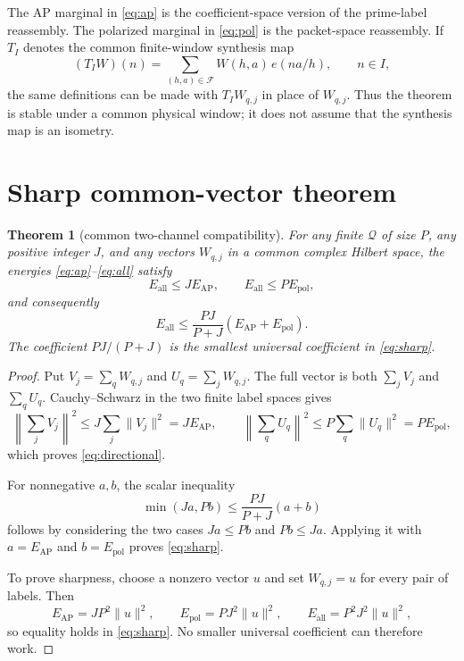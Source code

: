 \documentclass[11pt]{article}
\newtheorem{theorem}{Theorem}[section]
\theoremstyle{remark}
\newcommand{\Eall}{E_{\mathrm{all}}}
\newcommand{\Eap}{E_{\mathrm{AP}}}
\newcommand{\Epol}{E_{\mathrm{pol}}}
\newcommand{\Qset}{\mathcal Q}
\begin{document}
The AP marginal in \eqref{eq:ap} is the coefficient-space version of the
prime-label reassembly.  The polarized marginal in \eqref{eq:pol} is the
packet-space reassembly.  If $T_I$ denotes the common finite-window synthesis
map
\[
 (T_IW)(n)=\sum_{(h,a)\in\mathcal F}W(h,a)\,e(na/h),
 \qquad n\in I,
\]
the same definitions can be made with $T_IW_{q,j}$ in place of $W_{q,j}$.
Thus the theorem is stable under a common physical window; it does not assume
that the synthesis map is an isometry.

\section{Sharp common-vector theorem}

\begin{theorem}[common two-channel compatibility]
\label{thm:compatibility}
For any finite $\Qset$ of size $P$, any positive integer $J$, and any vectors
$W_{q,j}$ in a common complex Hilbert space, the energies
\eqref{eq:ap}--\eqref{eq:all} satisfy
\begin{equation}
 \Eall\leq J\Eap,\qquad \Eall\leq P\Epol,
 \label{eq:directional}
\end{equation}
and consequently
\begin{equation}
 \Eall\leq \frac{PJ}{P+J}(\Eap+\Epol).
 \label{eq:sharp}
\end{equation}
The coefficient $PJ/(P+J)$ is the smallest universal coefficient in
\eqref{eq:sharp}.
\end{theorem}

\begin{proof}
Put $V_j=\sum_qW_{q,j}$ and $U_q=\sum_jW_{q,j}$.  The full vector is both
$\sum_jV_j$ and $\sum_qU_q$.  Cauchy--Schwarz in the two finite label spaces
gives
\[
 \left\|\sum_jV_j\right\|^2\leq J\sum_j\|V_j\|^2=J\Eap,
 \qquad
 \left\|\sum_qU_q\right\|^2\leq P\sum_q\|U_q\|^2=P\Epol,
\]
which proves \eqref{eq:directional}.

For nonnegative $a,b$, the scalar inequality
\[
 \min(Ja,Pb)\leq \frac{PJ}{P+J}(a+b)
\]
follows by considering the two cases $Ja\leq Pb$ and $Pb\leq Ja$.  Applying
it with $a=\Eap$ and $b=\Epol$ proves \eqref{eq:sharp}.

To prove sharpness, choose a nonzero vector $u$ and set $W_{q,j}=u$ for every
pair of labels.  Then
\[
 \Eap=JP^2\|u\|^2,\qquad
 \Epol=PJ^2\|u\|^2,\qquad
 \Eall=P^2J^2\|u\|^2,
\]
so equality holds in \eqref{eq:sharp}.  No smaller universal coefficient
can therefore work.
\end{proof}
\end{document}
